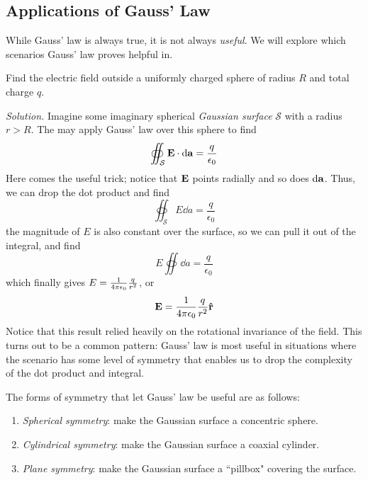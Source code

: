 \subsection*{Applications of Gauss' Law}
While Gauss' law is always true, it is not always \textit{useful}. We will explore which scenarios Gauss' law proves helpful in.
\begin{example}
    Find the electric field outside a uniformly charged sphere of radius $R$ and total charge $q$.

    \textit{Solution.} Imagine some imaginary spherical \textit{Gaussian surface} $\mathcal S$ with a radius $r > R$. The may apply Gauss' law over this sphere to find
    \[ \oiint_\mathcal{S} \mathbf{E} \cdot \dd \mathbf{a} = \frac{q}{\epsilon_0}\]
    Here comes the useful trick; notice that $\mathbf{E}$ points radially and so does $\dd \mathbf{a}$. Thus, we can drop the dot product and find
    \[ \oiint_\mathcal{S} E\dd a = \frac{q}{\epsilon_0} \]
    the magnitude of $E$ is also constant over the surface, so we can pull it out of the integral, and find
    \[ E\oiint \dd a = \frac{q}{\epsilon_0} \]
    which finally gives $E = \frac{1}{4\pi \epsilon_0} \frac{q}{r^2}$, or
    \[ \mathbf{E} = \frac{1}{4\pi \epsilon_0}\frac{q}{r^2}\mathbf{\hat{r}} \]
    Notice that this result relied heavily on the rotational invariance of the field. This turns out to be a common pattern: Gauss' law is most useful in situations where the scenario has some level of symmetry that enables us to drop the complexity of the dot product and integral.
\end{example}
The forms of symmetry that let Gauss' law be useful are as follows:
\begin{enumerate}
    \item \textit{Spherical symmetry}: make the Gaussian surface a concentric sphere.
    \item \textit{Cylindrical symmetry}: make the Gaussian surface a coaxial cylinder.
    \item \textit{Plane symmetry}: make the Gaussian surface a ``pillbox" covering the surface.
\end{enumerate}
